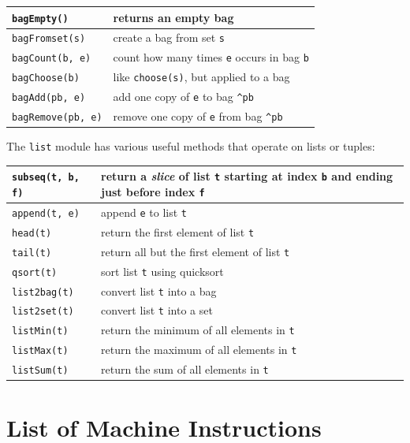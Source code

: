 \documentclass{report}
\begin{document}
\vspace{1em}
\begin{tabular}{|l|l|}
\hline
\texttt{bagEmpty()} & returns an empty bag\\
\hline
\texttt{bagFromset(s)} & create a bag from set \texttt{s}\\
\hline
\texttt{bagCount(b, e)} & count how many times \texttt{e} occurs in bag \texttt{b}\\
\hline
\texttt{bagChoose(b)} & like \texttt{choose(s)}, but applied to a bag\\
\hline
\texttt{bagAdd(pb, e)} & add one copy of \texttt{e} to bag \texttt{\^{}pb}\\
\hline
\texttt{bagRemove(pb, e)} & remove one copy of \texttt{e} from bag \texttt{\^{}pb}\\
\hline
\end{tabular}
\vspace{1em}

\noindent
{}
The \texttt{list} module has various useful methods that operate on lists
or tuples:

\vspace{1em}
\begin{tabular}{|l|l|}
\hline
\texttt{subseq(t, b, f)} & return a \emph{slice} of list \texttt{t} starting
at index \texttt{b} and ending just before index \texttt{f}\\
\hline
\texttt{append(t, e)} & append \texttt{e} to list \texttt{t}\\
\hline
\texttt{head(t)} & return the first element of list \texttt{t}\\
\hline
\texttt{tail(t)} & return all but the first element of list \texttt{t}\\
\hline
\texttt{qsort(t)} & sort list \texttt{t} using quicksort\\
\hline
\texttt{list2bag(t)} & convert list \texttt{t} into a bag \\
\hline
\texttt{list2set(t)} & convert list \texttt{t} into a set \\
\hline
\texttt{listMin(t)} & return the minimum of all elements in \texttt{t}\\
\hline
\texttt{listMax(t)} & return the maximum of all elements in \texttt{t}\\
\hline
\texttt{listSum(t)} & return the sum of all elements in \texttt{t}\\
\hline
\end{tabular}

\chapter{List of Machine Instructions}
\label{ap:cxlbytecode}
\end{document}
